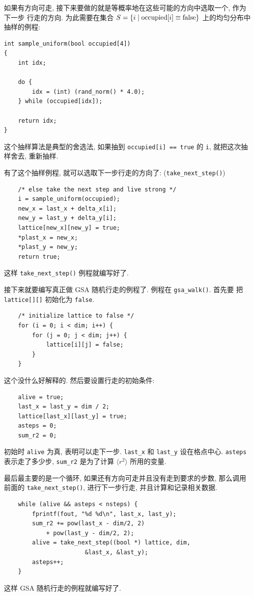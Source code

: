\documentclass{ctexart}
\begin{document}
如果有方向可走, 接下来要做的就是等概率地在这些可能的方向中选取一个, 作为下一步
行走的方向. 为此需要在集合 $S = \{i\mid{\rm occupied}[i] \equiv{\rm false}\}$
上的均匀分布中抽样的例程:
\begin{verbatim}
int sample_uniform(bool occupied[4])
{
    int idx;

    do {
        idx = (int) (rand_norm() * 4.0);
    } while (occupied[idx]);

    return idx;
}
\end{verbatim}
这个抽样算法是典型的舍选法, 如果抽到 \verb|occupied[i] == true| 的 \verb|i|,
就把这次抽样舍去, 重新抽样.

有了这个抽样例程, 就可以选取下一步行走的方向了: (\verb|take_next_step()|)
\begin{verbatim}
    /* else take the next step and live strong */
    i = sample_uniform(occupied);
    new_x = last_x + delta_x[i];
    new_y = last_y + delta_y[i];
    lattice[new_x][new_y] = true;
    *plast_x = new_x;
    *plast_y = new_y;
    return true;
\end{verbatim}
这样 \verb|take_next_step()| 例程就编写好了.

接下来就要编写真正做 GSA 随机行走的例程了. 例程在 \verb|gsa_walk()|. 首先要
把 \verb|lattice[][]| 初始化为 \verb|false|.
\begin{verbatim}
    /* initialize lattice to false */
    for (i = 0; i < dim; i++) {
        for (j = 0; j < dim; j++) {
            lattice[i][j] = false;
        }
    }
\end{verbatim}
这个没什么好解释的. 然后要设置行走的初始条件:
\begin{verbatim}
    alive = true;
    last_x = last_y = dim / 2;
    lattice[last_x][last_y] = true;
    asteps = 0;
    sum_r2 = 0;
\end{verbatim}
初始时 \verb|alive| 为真, 表明可以走下一步. \verb|last_x| 和 \verb|last_y|
设在格点中心. \verb|asteps| 表示走了多少步, \verb|sum_r2| 是为了计算
$\langle r^2\rangle$ 所用的变量.

最后最主要的是一个循环, 如果还有方向可走并且没有走到要求的步数, 那么调用前面的
\verb|take_next_step()|, 进行下一步行走, 并且计算和记录相关数据.
\begin{verbatim}
    while (alive && asteps < nsteps) {
        fprintf(fout, "%d %d\n", last_x, last_y);
        sum_r2 += pow(last_x - dim/2, 2)
            + pow(last_y - dim/2, 2);
        alive = take_next_step((bool *) lattice, dim,
                       &last_x, &last_y);
        asteps++;
    }
\end{verbatim}
这样 GSA 随机行走的例程就编写好了.
\end{document}
